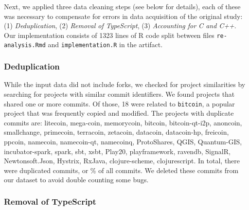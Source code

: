 \documentclass[acmsmall]{acmart}
\newcommand{\pct}[1]{#1\!\!\%\xspace}
\newcommand{\code}[1]{{\tt\small #1}\xspace}
\begin{document}
Next, we applied three data cleaning steps (see below for details), each of
these was necessary to compensate for errors in data acquisition of the
original study: (1) \emph{Deduplication}, (2) \emph{Removal of TypeScript},
(3) \emph{Accounting for C and C++}.  Our implementation consists of 1323
lines of R code split between files \code{\small re-analysis.Rmd} and
\code{\small implem\-entation.R} in the artifact.


\subsubsection{Deduplication}
While the input data did not include forks, we checked for project
similarities by searching for projects with similar commit identifiers.  We
found \numberOfProjectsWithDuplicates projects that shared one or more
commits. Of those, 18 were related to \code{bitcoin}, a popular project that
was frequently copied and modified. The projects with duplicate commits are:
%
{\newcommand{\xxx}[1]{{\sf\small #1}}
\xxx{litecoin},
\xxx{mega}-\xxx{coin},
\xxx{memorycoin},
\xxx{bitcoin},
\xxx{bitcoin-qt-i2p},
\xxx{anoncoin},
\xxx{smallchange},
\xxx{primecoin},
\xxx{terracoin},
\xxx{zetacoin},
\xxx{datacoin},
\xxx{datacoin-hp},
\xxx{freicoin},
\xxx{ppcoin},
\xxx{namecoin},
\xxx{namecoin-qt},
\xxx{namecoinq},
\xxx{ProtoShares},
\xxx{QGIS},
\xxx{Quantum-GIS},
\xxx{incub\-ator-spark},
\xxx{spark},          
\xxx{sbt},
\xxx{xsbt},
\xxx{Play20},
\xxx{playframework},
\xxx{ravendb},
\xxx{SignalR},
\xxx{Newtonsoft.Json},
\xxx{Hystrix},
\xxx{RxJava},
\xxx{clojure-scheme},
\xxx{clojurescript}}.
%
In total, there were \numDuplicateCommits duplicated commits, or
\pct{\percentageDuplicateCommits} of all commits. We deleted these commits
from our dataset to avoid double counting some bugs.

\subsubsection{Removal of TypeScript}
\end{document}
